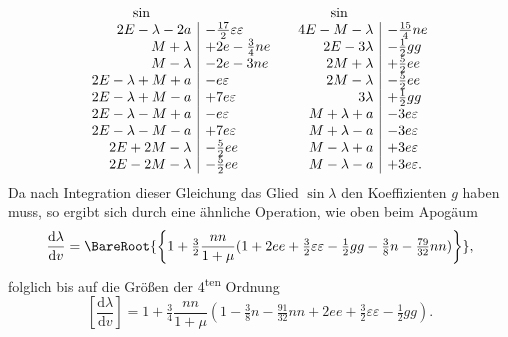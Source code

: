 \begingroup\small
\setlength{\arraycolsep}{3pt}\renewcommand{\arraystretch}{1.5}
\[
\begin{array}{r|l@{\qquad}r|l}
\multicolumn{1}{c}{\sin}& &\multicolumn{1}{c}{\sin}&\\
2E-\lambda-2a&-\tfrac{17}{2}\varepsilon\varepsilon
 &4E-M-\lambda&-\tfrac{15}{4}ne\\
M+\lambda&+2e-\tfrac34ne
 &2E-3\lambda&-\tfrac12gg\\
M-\lambda&-2e-3ne
 &2M+\lambda&+\tfrac52ee\\
2E-\lambda+M+a&-e\varepsilon
 &2M-\lambda&-\tfrac52ee\\
2E-\lambda+M-a&+7e\varepsilon
 &3\lambda&+\tfrac12gg\\
2E-\lambda-M+a&-e\varepsilon
 &M+\lambda+a&-3e\varepsilon\\
2E-\lambda-M-a&+7e\varepsilon
 &M+\lambda-a&-3e\varepsilon\\
2E+2M-\lambda&-\tfrac52ee
 &M-\lambda+a&+3e\varepsilon\\
2E-2M-\lambda&-\tfrac52ee
 &M-\lambda-a&+3e\varepsilon.
\end{array}
\]
\endgroup
\noindent Da nach Integration dieser Gleichung das Glied \(\sin\lambda\) den Koeffizienten
\(g\) haben muss, so ergibt sich durch eine ähnliche Operation, wie oben beim
Apogäum
\[
\frac{\mathrm{d}\lambda}{\mathrm{d}v}
=\BareRoot{\left\{1+\tfrac32\frac{nn}{1+\mu}
(1+2ee+\tfrac32\varepsilon\varepsilon-\tfrac12gg-\tfrac38n-\tfrac{79}{32}nn)\right\}},
\]
\noindent folglich bis auf die Größen der 4\textsuperscript{ten} Ordnung
\[
\left[\frac{\mathrm{d}\lambda}{\mathrm{d}v}\right]
=1+\tfrac34\frac{nn}{1+\mu}
(1-\tfrac38n-\tfrac{91}{32}nn+2ee+\tfrac32\varepsilon\varepsilon-\tfrac12gg).
\]
\clearpage
\endgroup
